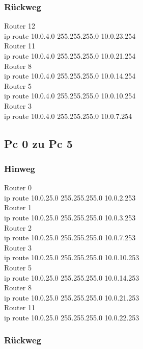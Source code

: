 \documentclass[a4paper]{article}
\begin{document}
\subsubsection{Rückweg}
Router 12\\
ip route 10.0.4.0 255.255.255.0 10.0.23.254\\
Router 11\\
ip route 10.0.4.0 255.255.255.0 10.0.21.254\\
Router 8\\
ip route 10.0.4.0 255.255.255.0 10.0.14.254\\
Router 5\\
ip route 10.0.4.0 255.255.255.0 10.0.10.254\\
Router 3\\
ip route 10.0.4.0 255.255.255.0 10.0.7.254\\

\subsection{Pc 0 zu Pc 5}

\subsubsection{Hinweg}

Router 0\\
ip route 10.0.25.0 255.255.255.0 10.0.2.253\\
Router 1\\
ip route 10.0.25.0 255.255.255.0 10.0.3.253\\
Router 2\\
ip route 10.0.25.0 255.255.255.0 10.0.7.253\\
Router 3\\
ip route 10.0.25.0 255.255.255.0 10.0.10.253\\
Router 5\\
ip route 10.0.25.0 255.255.255.0 10.0.14.253\\
Router 8\\
ip route 10.0.25.0 255.255.255.0 10.0.21.253\\
Router 11\\
ip route 10.0.25.0 255.255.255.0 10.0.22.253\\
\newpage
\subsubsection{Rückweg}
\end{document}
